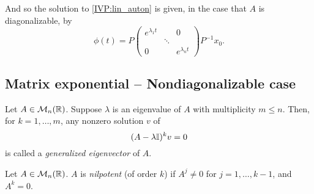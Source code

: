 And so the solution to \eqref{IVP:lin_auton} is given, in the case that $A$ is diagonalizable, by
\begin{equation}\label{sol:linear_sys_ODE_diagonalizable}
\phi(t)=P
\begin{pmatrix}
e^{\lambda_1t} & & 0 \\
& \ddots & \\
0 & & e^{\lambda_nt}
\end{pmatrix}
P^{-1}x_0.
\end{equation}



\subsection{Matrix exponential -- Nondiagonalizable case}
\begin{definition}
Let $A\in\mathcal{M}_n(\mathbb{R})$. Suppose $\lambda$ is an eigenvalue of $A$ with multiplicity $m\leq n$. Then, for $k=1,\ldots,m$, any nonzero solution $v$ of
\[
(A-\lambda\mathbb{I})^kv=0
\]
is called a \emph{generalized eigenvector} of $A$.
\end{definition}


\begin{definition}
Let $A\in\mathcal{M}_n(\mathbb{R})$. $A$ is \emph{nilpotent} (of order $k$) if $A^{j}\neq 0$ for $j=1,\ldots,k-1$, and $A^k=0$.
\end{definition}



